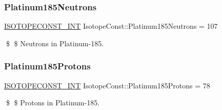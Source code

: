 \subsubsection{\texorpdfstring{Platinum185\+Neutrons}{Platinum185Neutrons}}
{\footnotesize\ttfamily \mbox{\hyperlink{group___isotope_const-_macros_ga5f18360b3e99483a35c32d789e62621c}{I\+S\+O\+T\+O\+P\+E\+C\+O\+N\+S\+T\+\_\+\+I\+NT}} Isotope\+Const\+::\+Platinum185\+Neutrons = 107}

\$ \$ Neutrons in Platinum-\/185. \mbox{\label{group___isotope_const-_platinum-_pt185_ga3918d8596054baec629dc6fd36fa1b17}} 
\subsubsection{\texorpdfstring{Platinum185\+Protons}{Platinum185Protons}}
{\footnotesize\ttfamily \mbox{\hyperlink{group___isotope_const-_macros_ga5f18360b3e99483a35c32d789e62621c}{I\+S\+O\+T\+O\+P\+E\+C\+O\+N\+S\+T\+\_\+\+I\+NT}} Isotope\+Const\+::\+Platinum185\+Protons = 78}

\$ \$ Protons in Platinum-\/185. 